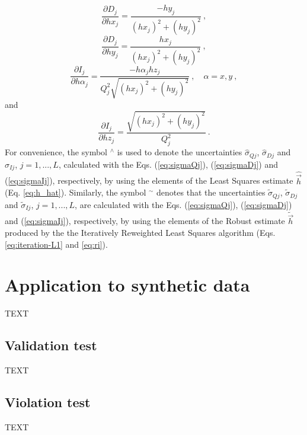 \documentclass[journal abbreviation, npg]{copernicus}
\begin{document}
\begin{equation}
\frac{\partial D_{j}}{\partial hx_{j}} = \dfrac{- hy_{j}}{ \left( hx_{j} \right)^{2} + \left( hy_{j} \right)^{2}} \: ,
\label{eq:dDj-dhxj}
\end{equation}
\begin{equation}
\frac{\partial D_{j}}{\partial hy_{j}} = \dfrac{ hx_{j} }{ \left( hx_{j} \right)^{2} + \left( hy_{j} \right)^{2}} \: ,
\label{eq:dDj-dhyj}
\end{equation}
\begin{equation}
\frac{\partial I_{j}}{\partial h \alpha_{j}} = \dfrac{-h \alpha_{j} hz_{j}}{Q_{j}^{2} \sqrt{\left( hx_{j} \right)^{2} + \left( hy_{j} \right)^{2}}} \: , \quad \alpha = x, y \: ,
\label{eq:dIj-dhalphaj}
\end{equation}
and
\begin{equation}
\frac{\partial I_{j}}{\partial hz_{j}} = \dfrac{ \sqrt{\left( hx_{j} \right)^{2} + \left( hy_{j} \right)^{2}} }{Q_{j}^{2}} \: .
\label{eq:dIj-dhzj}
\end{equation}
For convenience, the symbol $^\wedge$ is used to denote the uncertainties $\hat{\sigma}_{Qj}$, $\hat{\sigma}_{Dj}$ and $\hat{\sigma}_{Ij}$, $j = 1, ..., L$, calculated with the Eqs. (\ref{eq:sigmaQj}), (\ref{eq:sigmaDj}) and (\ref{eq:sigmaIj}), respectively, by using the elements of the Least Squares estimate $\hat{\vec{h}}$ (Eq. \ref{eq:h_hat}). Similarly, the symbol $^\sim$ denotes that the uncertainties $\tilde{\sigma}_{Qj}$, $\tilde{\sigma}_{Dj}$ and $\tilde{\sigma}_{Ij}$, $j = 1, ..., L$, are calculated with the Eqs. (\ref{eq:sigmaQj}), (\ref{eq:sigmaDj}) and (\ref{eq:sigmaIj}), respectively, by using the elements of the Robust estimate $\tilde{\vec{h}}$ produced by the the Iteratively Reweighted Least Squares algorithm (Eqs. \ref{eq:iteration-L1} and \ref{eq:ri}).

\section{Application to synthetic data}
TEXT

\subsection{Validation test}
TEXT

\subsection{Violation test}
TEXT
\end{document}
